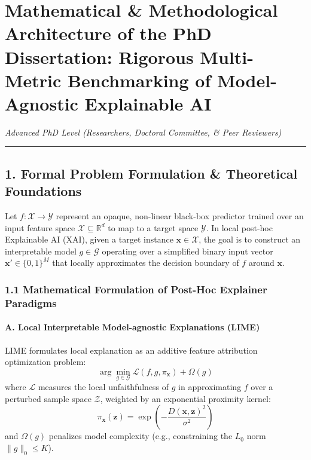 \documentclass[
]{article}
\author{}
\date{}
\begin{document}
\section{Mathematical \& Methodological Architecture of the PhD
Dissertation: Rigorous Multi-Metric Benchmarking of Model-Agnostic
Explainable
AI}\label{mathematical-methodological-architecture-of-the-phd-dissertation-rigorous-multi-metric-benchmarking-of-model-agnostic-explainable-ai}

\emph{Advanced PhD Level (Researchers, Doctoral Committee, \& Peer
Reviewers)}

\begin{center}\rule{0.5\linewidth}{0.5pt}\end{center}

\subsection{1. Formal Problem Formulation \& Theoretical
Foundations}\label{formal-problem-formulation-theoretical-foundations}

Let \(f: \mathcal{X} \to \mathcal{Y}\) represent an opaque, non-linear
black-box predictor trained over an input feature space
\(\mathcal{X} \subseteq \mathbb{R}^d\) to map to a target space
\(\mathcal{Y}\). In local post-hoc Explainable AI (XAI), given a target
instance \(\mathbf{x} \in \mathcal{X}\), the goal is to construct an
interpretable model \(g \in \mathcal{G}\) operating over a simplified
binary input vector \(\mathbf{x}' \in \{0, 1\}^M\) that locally
approximates the decision boundary of \(f\) around \(\mathbf{x}\).

\subsubsection{1.1 Mathematical Formulation of Post-Hoc Explainer
Paradigms}\label{mathematical-formulation-of-post-hoc-explainer-paradigms}

\paragraph{A. Local Interpretable Model-agnostic Explanations
(LIME)}\label{a.-local-interpretable-model-agnostic-explanations-lime}

LIME formulates local explanation as an additive feature attribution
optimization problem:
\[\arg\min_{g \in \mathcal{G}} \mathcal{L}(f, g, \pi_{\mathbf{x}}) + \Omega(g)\]
where \(\mathcal{L}\) measures the local unfaithfulness of \(g\) in
approximating \(f\) over a perturbed sample space \(\mathcal{Z}\),
weighted by an exponential proximity kernel:
\[\pi_{\mathbf{x}}(\mathbf{z}) = \exp\left( -\frac{D(\mathbf{x}, \mathbf{z})^2}{\sigma^2} \right)\]
and \(\Omega(g)\) penalizes model complexity (e.g., constraining the
\(L_0\) norm \(\|g\|_0 \le K\)).
\end{document}
